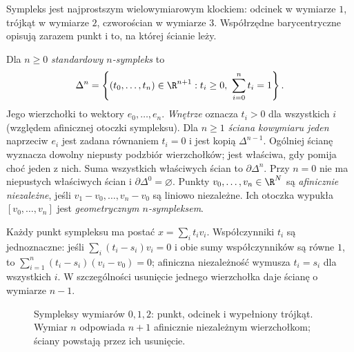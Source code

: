 Sympleks jest najprostszym wielowymiarowym
klockiem: odcinek w wymiarze $1$, trójkąt
w wymiarze $2$, czworościan w wymiarze $3$.
Współrzędne barycentryczne opisują
zarazem punkt i to, na której ścianie leży.

\begin{definicja}
\label{def:sympleks-standardowy}
Dla $n\geq0$ \emph{standardowy $n$-sympleks}
to
\[
 \Delta^n=
 \left\{(t_0,\ldots,t_n)\in\R^{n+1}:
 t_i\geq0,\ \sum_{i=0}^{n}t_i=1\right\}.
\]
Jego wierzchołki to wektory $e_0,\ldots,e_n$.
\emph{Wnętrze} oznacza $t_i>0$ dla wszystkich $i$
(względem afinicznej otoczki sympleksu).
Dla $n\geq1$ \emph{ściana kowymiaru jeden} naprzeciw $e_i$
jest zadana równaniem $t_i=0$ i jest kopią $\Delta^{n-1}$.
Ogólniej ścianę wyznacza dowolny niepusty podzbiór wierzchołków;
jest właściwa, gdy pomija choć jeden z nich.
Suma wszystkich właściwych ścian to $\partial\Delta^n$.
Przy $n=0$ nie ma niepustych właściwych ścian i $\partial\Delta^0=\varnothing$.
Punkty $v_0,\ldots,v_n\in\R^N$
są \emph{afinicznie niezależne}, jeśli
$v_1-v_0,\ldots,v_n-v_0$ są liniowo
niezależne. Ich otoczka wypukła
$[v_0,\ldots,v_n]$ jest
\emph{geometrycznym $n$-sympleksem}.
\end{definicja}

Każdy punkt sympleksu ma postać
$x=\sum_i t_iv_i$. Współczynniki
$t_i$ są jednoznaczne: jeśli
$\sum_i(t_i-s_i)v_i=0$ i obie sumy
współczynników są równe $1$, to
$\sum_{i=1}^n(t_i-s_i)(v_i-v_0)=0$;
afiniczna niezależność wymusza
$t_i=s_i$ dla wszystkich $i$.
W szczególności usunięcie jednego
wierzchołka daje ścianę
o wymiarze $n-1$.

\begin{figure}[!htbp]
\centering
{}
\caption{Sympleksy wymiarów $0,1,2$: punkt,
odcinek i wypełniony trójkąt. Wymiar
$n$ odpowiada $n+1$ afinicznie niezależnym
wierzchołkom; ściany powstają przez ich usunięcie.}
\label{fig:sympleks-trojkat}
\end{figure}

